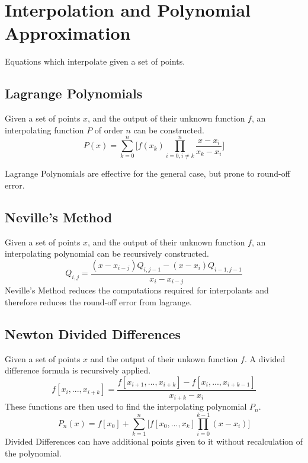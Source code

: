\documentclass[10pt]{article}
\numberwithin{equation}{subsection}
\begin{document}
    \section{Interpolation and Polynomial Approximation}

        Equations which interpolate given a set of points.

        \subsection{Lagrange Polynomials}

            Given a set of points $x$, and the output of their unknown function
            $f$, an interpolating function $P$ of order $n$ can be constructed.
            $$P(x) = \sum_{k=0}^n \Big[ f(x_k) \prod _{i=0, i\neq k}^n \frac{x - x_{i}}{x_{k} - x_{i}} \Big]$$

            Lagrange Polynomials are effective for the general case, but prone
            to round-off error.\\

            

        \subsection{Neville's Method}

            Given a set of points $x$, and the output of their unknown function
            $f$, an interpolating polynomial can be recursively constructed.
            $$Q_{i,j} = \frac{(x - x_{i-j})Q_{i,j-1} - (x - x_i)Q_{i-1,j-1}}{x_i - x_{i-j}}$$
            Neville's Method reduces the computations required for interpolants
            and therefore reduces the round-off error from lagrange.\\

            

        \subsection{Newton Divided Differences}

            Given a set of points $x$ and the output of their
            unkown function $f$. A divided difference formula is recursively
            applied.
            $$ f[x_i, ..., x_{i+k}] = \frac{f[x_{i+1},...,x_{i+k}] - f[x_{i},...,x_{i+k-1}]}{x_{i+k} - x_i}$$
            These functions are then used to find the interpolating polynomial
            $P_n$.
            $$P_n(x) = f[x_0] + \sum_{k=1}^n \Big[ f[x_0,...,x_k] \prod_{i=0}^{k-1} (x - x_i) \Big]$$
            Divided Differences can have additional points given to it without
            recalculation of the polynomial.\\
\end{document}
